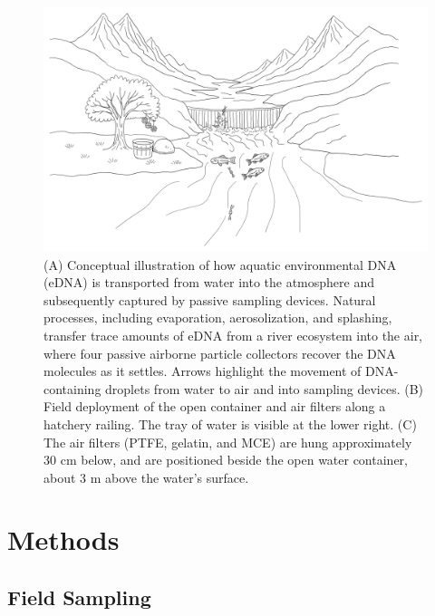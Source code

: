 \documentclass{article}
\begin{document}
\begin{figure}[tbhp] 
\centering
\includegraphics[width=13.5cm]{Plots/Figure_1_draw.pdf}  
\caption{(A) Conceptual illustration of how aquatic environmental DNA (eDNA) is transported from water into the atmosphere and subsequently captured by passive sampling devices. Natural processes, including evaporation, aerosolization, and splashing, transfer trace amounts of eDNA from a river ecosystem into the air, where four passive airborne particle collectors recover the DNA molecules as it settles. Arrows highlight the movement of DNA-containing droplets from water to air and into sampling devices. (B) Field deployment of the open container and air filters along a hatchery railing. The tray of water is visible at the lower right. (C) The air filters (PTFE, gelatin, and MCE) are hung approximately 30 cm below, and are positioned beside the open water container, about 3 m above the water’s surface.}
\label{fig:AI_physical_model}
\end{figure}

\section{Methods}

\subsection{Field Sampling}
\end{document}
